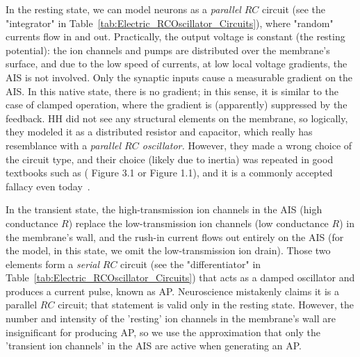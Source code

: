 In the resting state, we can model neurons as a \textit{parallel} $RC$ circuit (see the "integrator" in Table~\ref{tab:Electric_RCOscillator_Circuits}), where "random" currents flow in and out. Practically,
the output voltage is constant (the resting potential): the
ion channels and pumps are distributed over the membrane's surface,
and due to the low speed of currents, at low local voltage gradients,
the \gls{AIS} is not involved. Only the synaptic inputs cause a
measurable gradient on the \gls{AIS}. In this native state, there is no gradient; in this sense, it is similar to the case of clamped operation, where the gradient is (apparently) suppressed by the feedback.
\gls{HH} did not see any structural elements on the membrane,
so logically, they modeled it as a distributed resistor and capacitor,
which really has resemblance with a \textit{parallel $RC$ oscillator.}
However, they made a wrong choice of the circuit type, and their choice (likely due to inertia)
was repeated in good textbooks such as  (\cite{ JohnstonWuNeurophysiology:1995}
Figure 3.1 or \cite{KochBiophysics:1999} Figure 1.1), and
it is a commonly accepted fallacy even today~\cite{NeuralDynamicsGertsner:2014}.


In the transient state,  the 
high-transmission ion channels in the \gls{AIS} (high conductance $R$) replace the low-transmission ion channels (low conductance $R$) in the membrane's wall, and the rush-in current flows out entirely on the \gls{AIS}
(for the model, in this state, we omit the low-transmission ion drain).  
Those two elements form a \textit{serial} $RC$ circuit (see the "differentiator" in Table~\ref{tab:Electric_RCOscillator_Circuits}) that acts as a damped oscillator and produces a current pulse, known as \gls{AP}. Neuroscience mistakenly claims it is a parallel $RC$ circuit; that statement is valid only in the resting state.
However, the number and intensity of the 'resting' ion channels in the membrane's wall are insignificant for producing \gls{AP}, so  we use the approximation that only the 'transient ion channels' in the \gls{AIS} 
are active when generating an \gls{AP}.   


